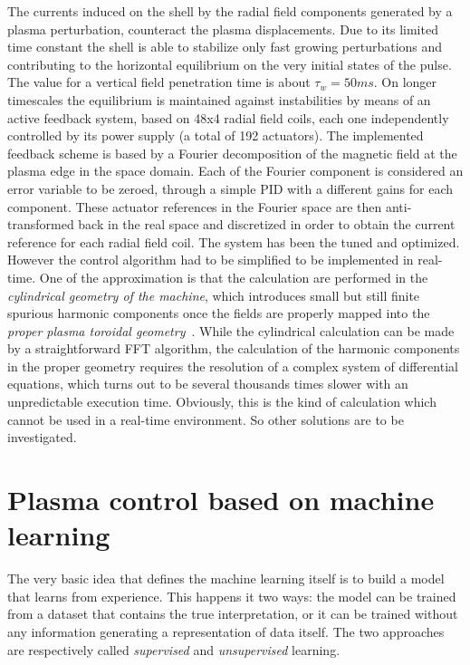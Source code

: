 The currents induced on the shell by the radial field components generated by a plasma perturbation, counteract the plasma displacements. Due to its limited time constant the shell is able to stabilize only fast growing perturbations
and contributing to the horizontal equilibrium on the very initial states of the pulse. The value for a vertical field penetration time is about $\tau_w = 50 ms$.
On longer timescales the equilibrium is maintained against instabilities by means of an active feedback system, based on 48x4 radial field coils, each one independently controlled by its power supply (a total of 192 actuators).
The implemented feedback scheme \cite{Marrelli_2007} is based by a Fourier decomposition  of the magnetic field at the plasma edge in the space domain. Each of the Fourier component is considered an error variable to be zeroed, through a simple PID with a different gains for each component. These actuator references in the Fourier space are then anti-transformed back in the real space and discretized in order to obtain the current reference for each radial field coil.
The system has been the tuned and optimized. However the control algorithm had to be simplified to be implemented in real-time. One of the approximation is that the calculation are performed in the \emph{cylindrical geometry of the machine}, which introduces small but still finite spurious harmonic components once the fields are properly mapped into the \emph{proper plasma toroidal geometry}~\cite{Zanca_2004}. While the cylindrical calculation can be made by a straightforward FFT algorithm, the calculation of the harmonic components in the proper geometry requires the resolution of a complex system of differential equations, which turns out to be several thousands times slower with an unpredictable execution time.
Obviously, this is the kind of calculation which cannot be used in a real-time environment. So other solutions are to be investigated.

\section{Plasma control based on machine learning}

The very basic idea that defines the machine learning itself is to build a model that learns from experience. This happens it two ways: the model can be trained from a dataset that contains the true interpretation, or it can be trained without any information generating a representation of data itself. The two approaches are respectively called \textit{supervised} and \textit{unsupervised} learning.

